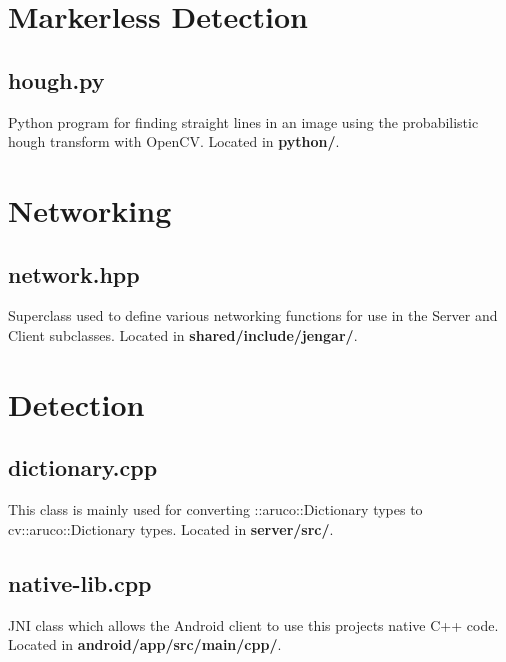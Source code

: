 \newpage\minitoc

\lstset{basicstyle=\scriptsize}

\begin{landscape}
\begin{multicols}{2}

\section{Markerless Detection}
\subsection{hough.py}\label{code:houghpy}
Python program for finding straight lines in an image using the probabilistic hough transform with OpenCV. Located in \textbf{python/}.
\texttt{}

\section{Networking}\label{codesec:network}
\subsection{network.hpp}\label{code:network}
Superclass used to define various networking functions for use in the Server and Client subclasses. Located in \textbf{shared/include/jengar/}.
\texttt{}

\section{Detection}\label{codesec:detection}

\subsection{dictionary.cpp}\label{code:dictionary}
This class is mainly used for converting ::aruco::Dictionary types to cv::aruco::Dictionary types. Located in \textbf{server/src/}.
\texttt{}

\subsection{native-lib.cpp}\label{code:native}
JNI class which allows the Android client to use this projects native C++ code. Located in \textbf{android/app/src/main/cpp/}.
\texttt{}


\end{multicols}
\end{landscape}
